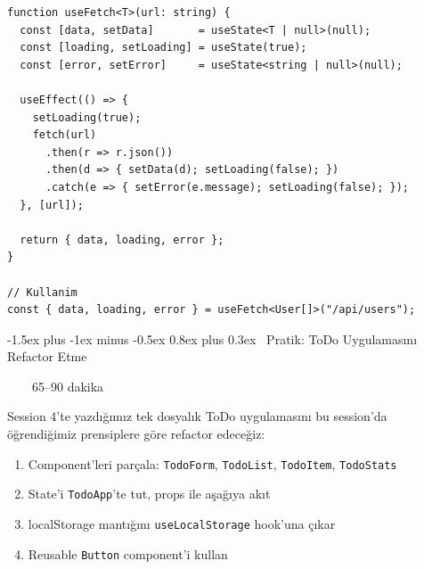 \documentclass[12pt, a4paper]{article}
\makeatletter
\renewcommand{\section}{%
  \@startsection{section}{1}{\z@}%
    {-1.5ex plus -1ex minus -0.5ex}%
    {0.8ex plus 0.3ex}%
    {\normalfont\Large\bfseries\sffamily\color{primary}}%
}
\newcommand{\timebadge}[1]{%
  \noindent
  \colorbox{primary}{\color{white}\sffamily\bfseries\small\strut~~\faStopwatch~~#1~~}%
  \par\vspace{4pt}%
}
\makeatother
\begin{document}
\vspace{6pt}

\begin{warningbox}
\begin{tcolorbox}[enhanced, colback=codebg, colframe=gray!30,
    colbacktitle=hookcol!85!black, coltitle=white, arc=4pt, sharp corners=northwest]
\begin{lstlisting}[style=jsxstyle]
function useFetch<T>(url: string) {
  const [data, setData]       = useState<T | null>(null);
  const [loading, setLoading] = useState(true);
  const [error, setError]     = useState<string | null>(null);

  useEffect(() => {
    setLoading(true);
    fetch(url)
      .then(r => r.json())
      .then(d => { setData(d); setLoading(false); })
      .catch(e => { setError(e.message); setLoading(false); });
  }, [url]);

  return { data, loading, error };
}

// Kullanim
const { data, loading, error } = useFetch<User[]>("/api/users");
\end{lstlisting}
\end{tcolorbox}
\end{warningbox}

\newpage
\section{\faTools\ Pratik: ToDo Uygulamasını Refactor Etme}
\timebadge{65--90 dakika}

\begin{practicebox}
Session 4'te yazdığımız tek dosyalık ToDo uygulamasını bu session'da
öğrendiğimiz prensiplere göre refactor edeceğiz:
\begin{enumerate}
  \item Component'leri parçala: \texttt{TodoForm}, \texttt{TodoList},
        \texttt{TodoItem}, \texttt{TodoStats}
  \item State'i \texttt{TodoApp}'te tut, props ile aşağıya akıt
  \item localStorage mantığını \texttt{useLocalStorage} hook'una çıkar
  \item Reusable \texttt{Button} component'i kullan
\end{enumerate}
\end{practicebox}

\vspace{8pt}
\end{document}
